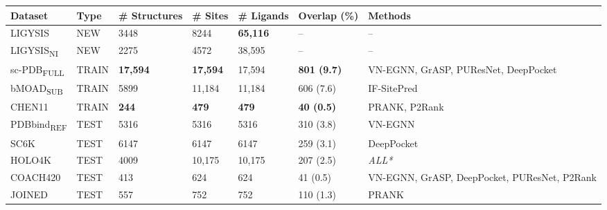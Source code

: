 \begin{landscape}
\begin{longtable}{|M{24mm}|M{20mm}|M{27mm}|M{20mm}|M{25mm}|M{25mm}|M{58mm}|}
\hline
\textbf{Dataset}    & \textbf{Type}  & \textbf{\# Structures} & \textbf{\# Sites} & \textbf{\# Ligands} & \textbf{Overlap (\%)} & \textbf{Methods}                                      \\ \hline
\endfirsthead
%
\endhead
%
LIGYSIS    & NEW   & 3448         & 8244    & \textbf{\textcolor{CBBlue}{65,116}}     & --          & --                                            \\ \hline
LIGYSIS\textsubscript{NI}  & NEW   & 2275         & 4572    & 38,595     & --          & --                                            \\ \hline
sc-PDB\textsubscript{FULL} & TRAIN & \textbf{\textcolor{CBBlue}{17,594}}        & \textbf{\textcolor{CBBlue}{17,594}}   & 17,594     & \textbf{\textcolor{CBOrange}{801 (9.7)}}        & VN-EGNN, GrASP, PUResNet, DeepPocket         \\ \hline
bMOAD\textsubscript{SUB}   & TRAIN & 5899         & 11,184   & 11,184     & 606 (7.6)        & IF-SitePred                                  \\ \hline
CHEN11     & TRAIN & \textbf{\textcolor{CBOrange}{244}}           & \textbf{\textcolor{CBOrange}{479}}      & \textbf{\textcolor{CBOrange}{479}}        & \textbf{\textcolor{CBBlue}{40 (0.5)}}        & PRANK, P2Rank                                       \\ \hline
PDBbind\textsubscript{REF} & TEST  & 5316         & 5316    & 5316      & 310 (3.8)        & VN-EGNN                                      \\ \hline
SC6K       & TEST  & 6147         & 6147    & 6147      & 259 (3.1)        & DeepPocket                                   \\ \hline
HOLO4K     & TEST  & 4009         & 10,175   & 10,175     & 207 (2.5)        & \textit{ALL*}                                         \\ \hline
COACH420   & TEST  & 413           & 624      & 624        & 41 (0.5)        & VN-EGNN, GrASP, DeepPocket, PUResNet, P2Rank \\ \hline
JOINED   & TEST  & 557           & 752      & 752        & 110 (1.3)        & PRANK \\ \hline

\end{longtable}
\end{landscape}
